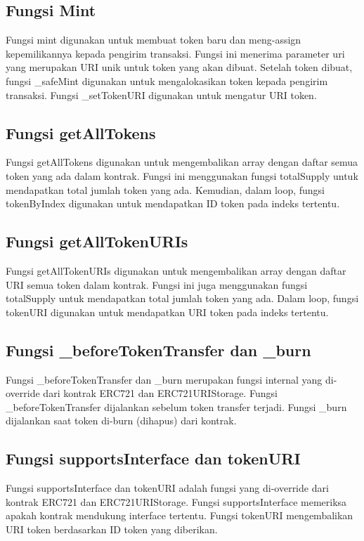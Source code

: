 \subsection{Fungsi Mint}
Fungsi mint digunakan untuk membuat token baru dan meng-assign kepemilikannya kepada pengirim transaksi.
Fungsi ini menerima parameter uri yang merupakan URI unik untuk token yang akan dibuat.
Setelah token dibuat, fungsi \_safeMint digunakan untuk mengalokasikan token kepada pengirim transaksi.
Fungsi \_setTokenURI digunakan untuk mengatur URI token.

\subsection{Fungsi getAllTokens}
Fungsi getAllTokens digunakan untuk mengembalikan array dengan daftar semua token yang ada dalam kontrak.
Fungsi ini menggunakan fungsi totalSupply untuk mendapatkan total jumlah token yang ada.
Kemudian, dalam loop, fungsi tokenByIndex digunakan untuk mendapatkan ID token pada indeks tertentu.

\subsection{Fungsi getAllTokenURIs}
Fungsi getAllTokenURIs digunakan untuk mengembalikan array dengan daftar URI semua token dalam kontrak.
Fungsi ini juga menggunakan fungsi totalSupply untuk mendapatkan total jumlah token yang ada.
Dalam loop, fungsi tokenURI digunakan untuk mendapatkan URI token pada indeks tertentu.

\subsection{Fungsi \_beforeTokenTransfer dan \_burn}
Fungsi \_beforeTokenTransfer dan \_burn merupakan fungsi internal yang di-override dari kontrak ERC721 dan ERC721URIStorage.
Fungsi \_beforeTokenTransfer dijalankan sebelum token transfer terjadi.
Fungsi \_burn dijalankan saat token di-burn (dihapus) dari kontrak.

\subsection{Fungsi supportsInterface dan tokenURI}
Fungsi supportsInterface dan tokenURI adalah fungsi yang di-override dari kontrak ERC721 dan ERC721URIStorage.
Fungsi supportsInterface memeriksa apakah kontrak mendukung interface tertentu.
Fungsi tokenURI mengembalikan URI token berdasarkan ID token yang diberikan.

